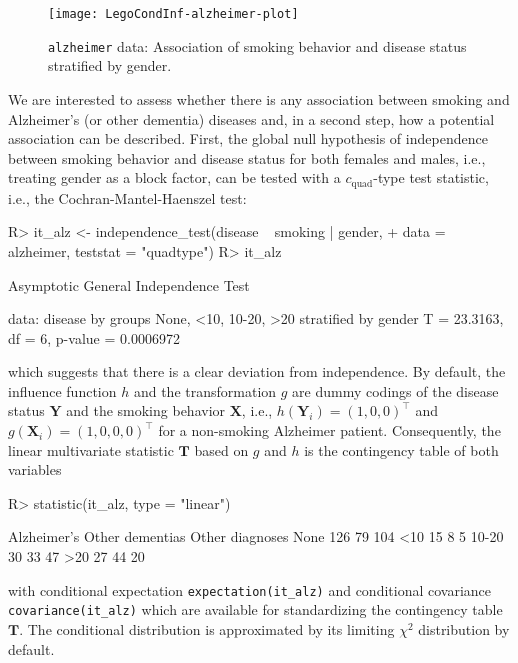 \documentclass{article}
\newcommand{\Robject}[1]{\texttt{#1}}
\newcommand{\Rcmd}[1]{\texttt{#1}}
\newcommand{\X}{\mathbf{X}}
\newcommand{\Y}{\mathbf{Y}}
\newcommand{\T}{\mathbf{T}}
\newenvironment{Schunk}{}{}
\begin{document}
\begin{sidewaysfigure}
\begin{center}
\texttt{[image: LegoCondInf-alzheimer-plot]}
\caption{\Robject{alzheimer} data: Association of
smoking behavior and disease status stratified by gender. \label{alz-plot}}
\end{center}
\end{sidewaysfigure}

We are interested to assess whether there is any association
between smoking and Alzheimer's (or other dementia) diseases and, in a
second step, how a potential association can be described. First,
the global null hypothesis of independence between smoking behavior and disease
status for both females and males, i.e., treating gender as a
block factor, can be tested with a $c_\text{quad}$-type test statistic, i.e., the 
Cochran-Mantel-Haenszel test:
\begin{Schunk}
\begin{Sinput}
R> it_alz <- independence_test(disease ~ smoking | gender, 
+     data = alzheimer, teststat = "quadtype")
R> it_alz
\end{Sinput}
\begin{Soutput}
	Asymptotic General Independence Test

data:  disease by groups None, <10, 10-20, >20 
	 stratified by gender 
T = 23.3163, df = 6, p-value = 0.0006972
\end{Soutput}
\end{Schunk}
which suggests that there is a clear deviation from independence. 
By default, the influence function $h$ and the transformation $g$ 
are dummy codings of the disease status $\Y$ and the smoking behavior $\X$, 
i.e., $h(\Y_i) = (1, 0, 0)^\top$ 
and $g(\X_i) = (1, 0, 0 ,0)^\top$ for a non-smoking Alzheimer patient. 
Consequently, the linear multivariate statistic $\T$ based on $g$ and $h$ 
is the contingency table of both variables 
\begin{Schunk}
\begin{Sinput}
R> statistic(it_alz, type = "linear")
\end{Sinput}
\begin{Soutput}
      Alzheimer's Other dementias Other diagnoses
None          126              79             104
<10            15               8               5
10-20          30              33              47
>20            27              44              20
\end{Soutput}
\end{Schunk}
with conditional expectation \Rcmd{expectation(it\_alz)} and conditional
covariance \Rcmd{covariance(it\_alz)} which are available for standardizing
the contingency table $\T$. The conditional distribution is approximated by
its limiting $\chi^2$ distribution by default. 
\end{document}

